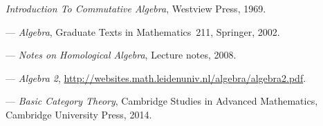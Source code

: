 
\begin{thebibliography}{100}

	{\it Introduction To Commutative Algebra},
	Westview Press, 1969.

 ---
	{\it Algebra},
	Graduate Texts in Mathematics~211, Springer, 2002.
	
 ---
	{\it Notes on Homological Algebra},
	Lecture notes, 2008.

 ---
	{\it Algebra 2}, {\url{http://websites.math.leidenuniv.nl/algebra/algebra2.pdf}}.

 ---
	{\it Basic Category Theory},
	Cambridge Studies in Advanced Mathematics,  Cambridge University Press, 2014.
	
\end{thebibliography}

\printindex

